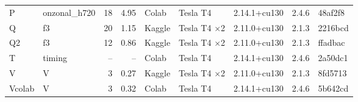 \begin{tabular}{@{}llrrlllll@{}}
P & onzonal\_h720 & 18 & 4.95 & Colab & Tesla T4 & 2.14.1+cu130 & 2.4.6 & 48af2f8 \\
Q & f3 & 20 & 1.15 & Kaggle & Tesla T4 $\times$2 & 2.11.0+cu130 & 2.1.3 & 2216bcd \\
Q2 & f3 & 12 & 0.86 & Kaggle & Tesla T4 $\times$2 & 2.11.0+cu130 & 2.1.3 & ffadbac \\
T & timing & -- & -- & Colab & Tesla T4 & 2.14.1+cu130 & 2.4.6 & 2a50dc1 \\
V & V & 3 & 0.27 & Kaggle & Tesla T4 $\times$2 & 2.11.0+cu130 & 2.1.3 & 8fd5713 \\
Vcolab & V & 3 & 0.32 & Colab & Tesla T4 & 2.14.1+cu130 & 2.4.6 & 5b642cd \\
\bottomrule
\end{tabular}
